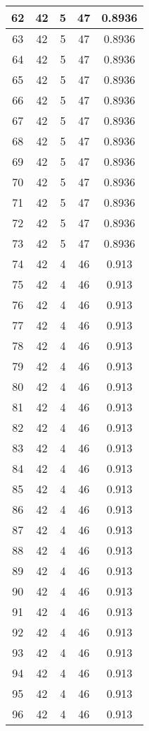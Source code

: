 \documentclass[letterpaper, 12pt]{article}
\begin{document}
\begin{longtable}{|c|c|c|c|c|}
\hline
62 & 42 & 5 & 47 & 0.8936 \\
\hline
63 & 42 & 5 & 47 & 0.8936 \\
\hline
64 & 42 & 5 & 47 & 0.8936 \\
\hline
65 & 42 & 5 & 47 & 0.8936 \\
\hline
66 & 42 & 5 & 47 & 0.8936 \\
\hline
67 & 42 & 5 & 47 & 0.8936 \\
\hline
68 & 42 & 5 & 47 & 0.8936 \\
\hline
69 & 42 & 5 & 47 & 0.8936 \\
\hline
70 & 42 & 5 & 47 & 0.8936 \\
\hline
71 & 42 & 5 & 47 & 0.8936 \\
\hline
72 & 42 & 5 & 47 & 0.8936 \\
\hline
73 & 42 & 5 & 47 & 0.8936 \\
\hline
74 & 42 & 4 & 46 & 0.913 \\
\hline
75 & 42 & 4 & 46 & 0.913 \\
\hline
76 & 42 & 4 & 46 & 0.913 \\
\hline
77 & 42 & 4 & 46 & 0.913 \\
\hline
78 & 42 & 4 & 46 & 0.913 \\
\hline
79 & 42 & 4 & 46 & 0.913 \\
\hline
80 & 42 & 4 & 46 & 0.913 \\
\hline
81 & 42 & 4 & 46 & 0.913 \\
\hline
82 & 42 & 4 & 46 & 0.913 \\
\hline
83 & 42 & 4 & 46 & 0.913 \\
\hline
84 & 42 & 4 & 46 & 0.913 \\
\hline
85 & 42 & 4 & 46 & 0.913 \\
\hline
86 & 42 & 4 & 46 & 0.913 \\
\hline
87 & 42 & 4 & 46 & 0.913 \\
\hline
88 & 42 & 4 & 46 & 0.913 \\
\hline
89 & 42 & 4 & 46 & 0.913 \\
\hline
90 & 42 & 4 & 46 & 0.913 \\
\hline
91 & 42 & 4 & 46 & 0.913 \\
\hline
92 & 42 & 4 & 46 & 0.913 \\
\hline
93 & 42 & 4 & 46 & 0.913 \\
\hline
94 & 42 & 4 & 46 & 0.913 \\
\hline
95 & 42 & 4 & 46 & 0.913 \\
\hline
96 & 42 & 4 & 46 & 0.913 \\

\end{longtable}
\end{document}
